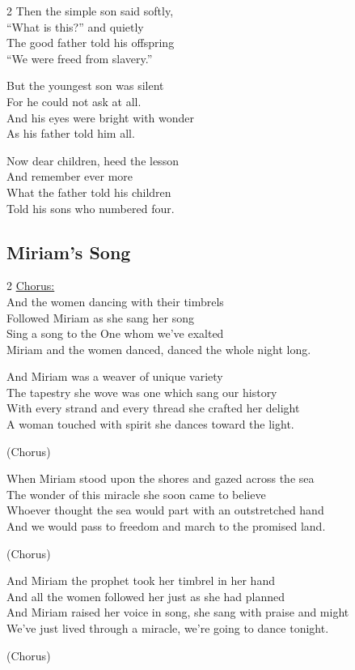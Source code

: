 \documentclass[12pt]{article}
\begin{document}
\begin{multicols}{2}
Then the simple son said softly, \\
``What is this?'' and quietly \\
The good father told his offspring \\
``We were freed from slavery.''

But the youngest son was silent \\
For he could not ask at all. \\
And his eyes were bright with wonder \\
As his father told him all.

Now dear children, heed the lesson \\
And remember ever more \\
What the father told his children \\
Told his sons who numbered four.

\end{multicols}

\pagebreak
\subsection*{Miriam's Song}
\begin{multicols}{2}
\underline{Chorus:} \\
And the women dancing with their timbrels \\
Followed Miriam as she sang her song \\
Sing a song to the One whom we've exalted \\
Miriam and the women danced, danced the whole night long.

And Miriam was a weaver of unique variety \\
The tapestry she wove was one which sang our history \\
With every strand and every thread she crafted her delight \\
A woman touched with spirit she dances toward the light.

(Chorus)

When Miriam stood upon the shores and gazed across the sea \\
The wonder of this miracle she soon came to believe \\
Whoever thought the sea would part with an outstretched hand \\
And we would pass to freedom and march to the promised land.

(Chorus)

And Miriam the prophet took her timbrel in her hand \\
And all the women followed her just as she had planned \\
And Miriam raised her voice in song, she sang with praise and might \\
We've just lived through a miracle, we're going to dance tonight.

(Chorus)

\end{multicols}
\vspace{5em}
\end{document}
